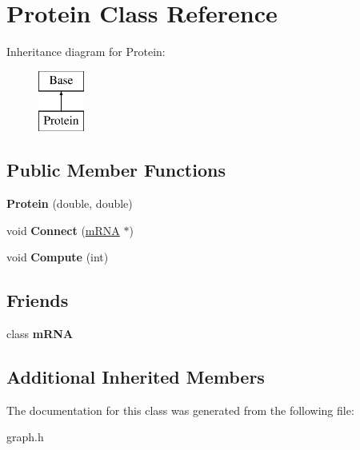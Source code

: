 \hypertarget{class_protein}{\section{Protein Class Reference}
\label{class_protein}
}
Inheritance diagram for Protein\-:\begin{figure}[H]
\begin{center}
\leavevmode
\includegraphics[height=2.000000cm]{class_protein}
\end{center}
\end{figure}
\subsection*{Public Member Functions}
\begin{DoxyCompactItemize}
\item 
\hypertarget{class_protein_a9f0a706232fd3e68c15263e2102fec02}{{\bfseries Protein} (double, double)}\label{class_protein_a9f0a706232fd3e68c15263e2102fec02}

\item 
\hypertarget{class_protein_a52cf8da9e08eeb67b44114af2d12f45c}{void {\bfseries Connect} (\hyperlink{classm_r_n_a}{m\-R\-N\-A} $\ast$)}\label{class_protein_a52cf8da9e08eeb67b44114af2d12f45c}

\item 
\hypertarget{class_protein_af977204f0e2ffe5544bcab971d5eeb0d}{void {\bfseries Compute} (int)}\label{class_protein_af977204f0e2ffe5544bcab971d5eeb0d}

\end{DoxyCompactItemize}
\subsection*{Friends}
\begin{DoxyCompactItemize}
\item 
\hypertarget{class_protein_a904bf77ec17baad950eb63ea5c40c6ea}{class {\bfseries m\-R\-N\-A}}\label{class_protein_a904bf77ec17baad950eb63ea5c40c6ea}

\end{DoxyCompactItemize}
\subsection*{Additional Inherited Members}


The documentation for this class was generated from the following file\-:\begin{DoxyCompactItemize}
\item 
graph.\-h\end{DoxyCompactItemize}
